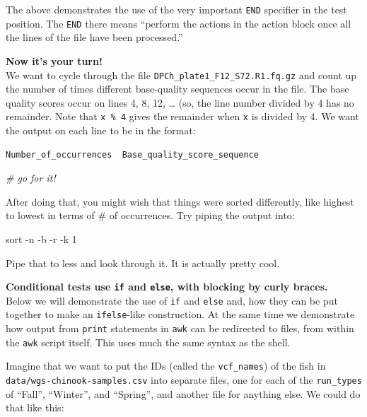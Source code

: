 \documentclass[]{krantz}
\makeatletter
\newenvironment{Shaded}{\begin{snugshade}}{\end{snugshade}}
\newcommand{\CommentTok}[1]{\textcolor[rgb]{0.37,0.37,0.37}{\textit{#1}}}
\newcommand{\FunctionTok}[1]{\textcolor[rgb]{0,0,0}{#1}}
\newcommand{\NormalTok}[1]{#1}
\newenvironment{kframe}{%
\medskip{}
\setlength{\fboxsep}{.8em}
 \def\at@end@of@kframe{}%
 \ifinner\ifhmode%
  \def\at@end@of@kframe{\end{minipage}}%
  \begin{minipage}{\columnwidth}%
 \fi\fi%
 \def\FrameCommand##1{\hskip\@totalleftmargin \hskip-\fboxsep
 \colorbox{shadecolor}{##1}\hskip-\fboxsep
     \hskip-\linewidth \hskip-\@totalleftmargin \hskip\columnwidth}%
 \MakeFramed {\advance\hsize-\width
   \@totalleftmargin\z@ \linewidth\hsize
   \@setminipage}}%
 {\par\unskip\endMakeFramed%
 \at@end@of@kframe}
\renewenvironment{Shaded}{\begin{kframe}}{\end{kframe}}
\makeatother
\begin{document}
The above demonstrates the use of the very important \texttt{END} specifier in the
test position. The \texttt{END} there means ``perform the actions in the action block
once all the lines of the file have been processed.''

\textbf{Now it's your turn!}\\
We want to cycle through the file \texttt{DPCh\_plate1\_F12\_S72.R1.fq.gz} and
count up the number of times different base-quality sequences occur in the file. The
base quality scores occur on lines 4, 8, 12, \ldots{} (so, the line number divided by 4 has
no remainder. Note that \texttt{x\ \%\ 4} gives the remainder when \texttt{x} is divided by 4. We want the
output on each line to be in the format:

\begin{verbatim}
Number_of_occurrences  Base_quality_score_sequence
\end{verbatim}

\begin{Shaded}
\begin{Highlighting}[]
\CommentTok{# go for it!}

\end{Highlighting}
\end{Shaded}

After doing that, you might wish that things were sorted differently, like highest to lowest
in terms of \# of occurrences. Try piping the output into:

\begin{Shaded}
\begin{Highlighting}[]
\FunctionTok{sort}\NormalTok{ -n -b -r -k 1}
\end{Highlighting}
\end{Shaded}

Pipe that to less and look through it. It is actually pretty cool.

\textbf{Conditional tests use \texttt{if} and \texttt{else}, with blocking by curly braces.}\\
Below we will demonstrate the use of \texttt{if} and \texttt{else} and, how they can be put together
to make an \texttt{ifelse}-like construction. At the same time we demonstrate how
output from \texttt{print} statements in \texttt{awk} can be redirected to files, from within
the \texttt{awk} script itself. This uses much the same syntax as the shell.

Imagine that we want to put the IDs (called the \texttt{vcf\_names}) of the fish
in \texttt{data/wgs-chinook-samples.csv} into separate files, one for each
of the \texttt{run\_types} of ``Fall'', ``Winter'', and ``Spring'', and another file
for anything else. We could do that like this:
\end{document}
